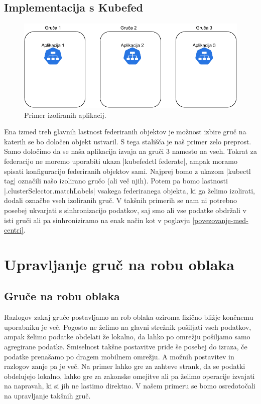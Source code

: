 \documentclass[a4paper, 12pt]{book}
\begin{document}
\section{Implementacija s Kubefed}
\begin{figure}[h]
\begin{center}
  \includegraphics[width=1.0\textwidth]{images/primer-izolirane-aplikacije.pdf}
\end{center}
\caption{Primer izoliranih aplikacij.}
\label{problem-prevelike-latence}
\end{figure}
Ena izmed treh glavnih lastnost federiranih objektov je možnost izbire gruč na katerih se bo določen objekt ustvaril. 
S tega stališča je naš primer zelo preprost.
Samo določimo da se naša aplikacija izvaja na gruči 3 namesto na vseh.
Tokrat za federacijo ne moremo uporabiti ukaza \spverb|kubefedctl federate|, ampak moramo spisati konfiguracijo federiranih objektov sami.
Najprej bomo z ukazom \spverb|kubectl tag| označili našo izolirano gručo (ali več njih).
Potem pa bomo lastnosti \spverb|.clusterSelector.matchLabels| vsakega federiranega objekta, ki ga želimo izolirati, dodali označbe vseh izoliranih gruč.
V takšnih primerih se nam ni potrebno posebej ukvarjati s sinhronizacijo podatkov, saj smo ali vse podatke obdržali v isti gruči ali pa sinhroniziramo na enak način kot v poglavju \ref{povezovanje-med-centri}.
\chapter{Upravljanje gruč na robu oblaka}
\label{edge-clusters}
\section{Gruče na robu oblaka}
Razlogov zakaj gruče postavljamo na rob oblaka oziroma fizično bližje konč\-ne\-mu uporabniku je več.
Pogosto ne želimo na glavni strežnik pošiljati vseh podatkov, ampak želimo podatke obdelati že lokalno, da lahko po omrežju pošiljamo samo agregirane podatke.
Smiselnost takšne postavitve pride še posebej do izraza, če podatke prenašamo po dragem mobilnem omrežju.
A možnih postavitev in razlogov zanje pa je več.
Na primer lahko gre za zahteve strank, da se podatki obdelujejo lokalno, lahko gre za zakonske omejitve ali pa želimo operacije izvajati na napravah, ki si jih ne lastimo direktno.
V našem primeru se bomo osredotočali na upravljanje takšnih gruč.
\end{document}
